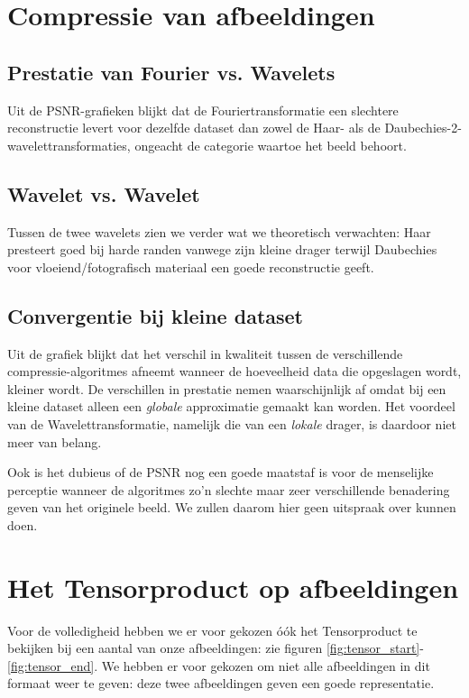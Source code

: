 \section{Compressie van afbeeldingen}

\subsection{Prestatie van Fourier vs. Wavelets}
Uit de PSNR-grafieken blijkt dat de Fouriertransformatie een slechtere reconstructie levert voor 
dezelfde dataset dan zowel de Haar- als de Daubechies-2-wavelettransformaties, 
ongeacht de categorie waartoe het beeld behoort.

\subsection{Wavelet vs. Wavelet}
Tussen de twee wavelets zien we verder wat we theoretisch verwachten: Haar presteert goed bij harde randen
vanwege zijn kleine drager terwijl Daubechies voor vloeiend/fotografisch materiaal een goede reconstructie geeft.

\subsection{Convergentie bij kleine dataset}
Uit de grafiek blijkt dat het verschil in kwaliteit tussen de verschillende compressie-algoritmes afneemt wanneer
de hoeveelheid data die opgeslagen wordt, kleiner wordt. 
De verschillen in prestatie nemen waarschijnlijk af omdat bij een kleine dataset alleen een \emph{globale}
approximatie gemaakt kan worden. 
Het voordeel van de Wavelettransformatie, namelijk die van een \emph{lokale} drager,
is daardoor niet meer van belang.

Ook is het dubieus of de PSNR nog een goede maatstaf is voor de menselijke perceptie wanneer de algoritmes
zo'n slechte maar zeer verschillende benadering geven van het originele beeld.
We zullen daarom hier geen uitspraak over kunnen doen.

\section{Het Tensorproduct op afbeeldingen}
Voor de volledigheid hebben we er voor gekozen \'o\'ok het Tensorproduct te bekijken bij een aantal 
van onze afbeeldingen: zie figuren \ref{fig:tensor_start}-\ref{fig:tensor_end}. We hebben er voor 
gekozen om niet alle afbeeldingen in dit formaat weer te geven: deze twee afbeeldingen geven een goede representatie.

